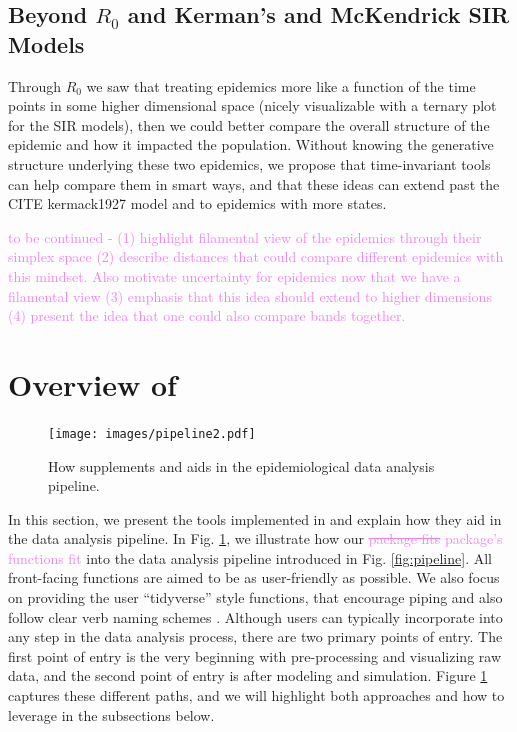 \documentclass[
  shortnames]{jss}
\begin{document}
\subsection[Beyond R0 and SIR]{Beyond \(R_0\) and Kerman's and
McKendrick SIR Models}\label{beyond-r0-sir}

Through \(R_0\) we saw that treating epidemics more like a function of
the time points in some higher dimensional space (nicely visualizable
with a ternary plot for the SIR models), then we could better compare
the overall structure of the epidemic and how it impacted the
population. Without knowing the generative structure underlying these
two epidemics, we propose that time-invariant tools can help compare
them in smart ways, and that these ideas can extend past the CITE
kermack1927 model and to epidemics with more states.

\textcolor{violet}{
to be continued - (1) highlight filamental view of the epidemics through their simplex space (2) describe distances that could compare different epidemics with this mindset. Also motivate uncertainty for epidemics now that we have a filamental view (3) emphasis that this idea should extend to higher dimensions (4) present the idea that one could also compare bands together.
}

\section[Package overview]{Overview of
}\label{sec:overview}

\afterpage{\clearpage}
\begin{figure}
    \centering
    \texttt{[image: images/pipeline2.pdf]}
    \caption{How  supplements and aids in the epidemiological data analysis pipeline.}
    \label{fig:pipeline2}
\end{figure}

In this section, we present the tools implemented in 
and explain how they aid in the data analysis pipeline. In Fig.
\ref{fig:pipeline2}, we illustrate how our
\textcolor{violet}{\sout{package fits} package's functions fit} into the
data analysis pipeline introduced in Fig. \ref{fig:pipeline}. All
front-facing functions are aimed to be as user-friendly as possible. We
also focus on providing the user ``tidyverse'' style functions, that
encourage piping and also follow clear verb naming schemes
\citep{Wickham2019}. Although users can typically incorporate
 into any step in the data analysis process, there are
two primary points of entry. The first point of entry is the very
beginning with pre-processing and visualizing raw data, and the second
point of entry is after modeling and simulation. Figure
\ref{fig:pipeline2} captures these different paths, and we will
highlight both approaches and how to leverage  in the
subsections below.
\end{document}
